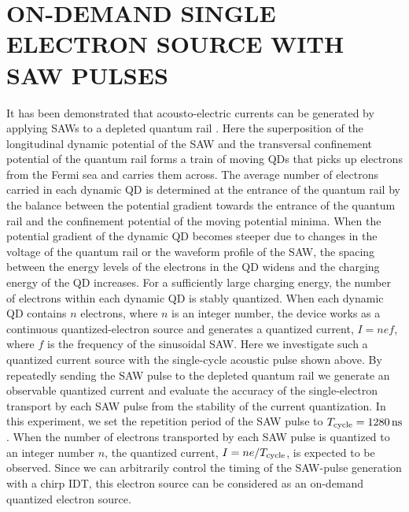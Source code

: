 \documentclass{article}
\begin{document}
\section{ON-DEMAND SINGLE ELECTRON SOURCE WITH SAW PULSES}
It has been demonstrated that acousto-electric currents can be generated by applying SAWs to a depleted quantum rail \cite{Shilton1996}.
Here the superposition of the longitudinal dynamic potential of the SAW and the transversal confinement potential of the quantum rail forms a train of moving QDs that picks up electrons from the Fermi sea and carries them across.
The average number of electrons carried in each dynamic QD is determined at the entrance of the quantum rail by the balance between the potential gradient
towards the entrance of the quantum rail and the confinement potential of the moving potential minima.
When the potential gradient of the dynamic QD becomes steeper due to changes in the voltage of the quantum rail or the waveform profile of the SAW, the spacing between the energy levels of the electrons in the QD widens and the charging energy of the QD increases.
For a sufficiently large charging energy, the number of electrons within each dynamic QD is stably quantized. 
When each dynamic QD contains $n$ electrons, where $n$ is an integer number, the device works as a continuous quantized-electron source and generates a quantized current, $I=nef$, where $f$ is the frequency of the sinusoidal SAW.
Here we investigate such a quantized current source with the single-cycle acoustic pulse shown above. 
By repeatedly sending the SAW pulse to the depleted quantum rail we generate an observable quantized current and evaluate the accuracy of the single-electron transport by each SAW pulse from the stability of the current quantization. In this experiment, we set the repetition period of the SAW pulse to $T_{\rm cycle} = \SI{1280}{ns}$. When the number of electrons transported by each SAW pulse is quantized to an integer number $n$, the quantized current, $I=ne/T_{\rm cycle}$, is expected to be observed. Since we can arbitrarily control the timing of the SAW-pulse generation with a chirp IDT, this electron source can be considered as an on-demand quantized electron source.
\end{document}
